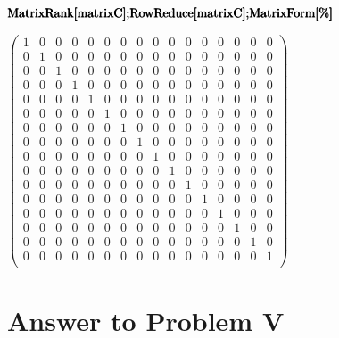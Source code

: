 \documentclass[11pt,a4paper]{article}
\begin{document}
\begin{doublespace}
\noindent\(\pmb{\text{MatrixRank}[\text{matrixC}];}\\
\pmb{\text{RowReduce}[\text{matrixC}];}\\
\pmb{\text{MatrixForm}[\%]}\)
\end{doublespace}

\begin{doublespace}
\noindent\(\left(
\begin{array}{cccccccccccccccc}
 1 & 0 & 0 & 0 & 0 & 0 & 0 & 0 & 0 & 0 & 0 & 0 & 0 & 0 & 0 & 0 \\
 0 & 1 & 0 & 0 & 0 & 0 & 0 & 0 & 0 & 0 & 0 & 0 & 0 & 0 & 0 & 0 \\
 0 & 0 & 1 & 0 & 0 & 0 & 0 & 0 & 0 & 0 & 0 & 0 & 0 & 0 & 0 & 0 \\
 0 & 0 & 0 & 1 & 0 & 0 & 0 & 0 & 0 & 0 & 0 & 0 & 0 & 0 & 0 & 0 \\
 0 & 0 & 0 & 0 & 1 & 0 & 0 & 0 & 0 & 0 & 0 & 0 & 0 & 0 & 0 & 0 \\
 0 & 0 & 0 & 0 & 0 & 1 & 0 & 0 & 0 & 0 & 0 & 0 & 0 & 0 & 0 & 0 \\
 0 & 0 & 0 & 0 & 0 & 0 & 1 & 0 & 0 & 0 & 0 & 0 & 0 & 0 & 0 & 0 \\
 0 & 0 & 0 & 0 & 0 & 0 & 0 & 1 & 0 & 0 & 0 & 0 & 0 & 0 & 0 & 0 \\
 0 & 0 & 0 & 0 & 0 & 0 & 0 & 0 & 1 & 0 & 0 & 0 & 0 & 0 & 0 & 0 \\
 0 & 0 & 0 & 0 & 0 & 0 & 0 & 0 & 0 & 1 & 0 & 0 & 0 & 0 & 0 & 0 \\
 0 & 0 & 0 & 0 & 0 & 0 & 0 & 0 & 0 & 0 & 1 & 0 & 0 & 0 & 0 & 0 \\
 0 & 0 & 0 & 0 & 0 & 0 & 0 & 0 & 0 & 0 & 0 & 1 & 0 & 0 & 0 & 0 \\
 0 & 0 & 0 & 0 & 0 & 0 & 0 & 0 & 0 & 0 & 0 & 0 & 1 & 0 & 0 & 0 \\
 0 & 0 & 0 & 0 & 0 & 0 & 0 & 0 & 0 & 0 & 0 & 0 & 0 & 1 & 0 & 0 \\
 0 & 0 & 0 & 0 & 0 & 0 & 0 & 0 & 0 & 0 & 0 & 0 & 0 & 0 & 1 & 0 \\
 0 & 0 & 0 & 0 & 0 & 0 & 0 & 0 & 0 & 0 & 0 & 0 & 0 & 0 & 0 & 1 \\
\end{array}
\right)\)
\end{doublespace}

\clearpage
\section{Answer to Problem V}\label{sec:P05}
\end{document}
